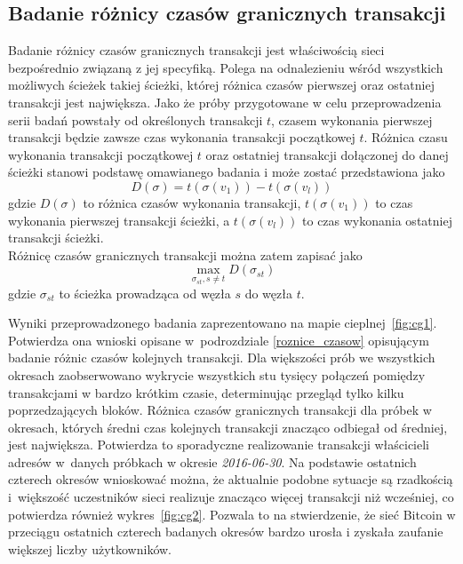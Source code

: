 \documentclass[12pt, twoside, final, openany]{mgr}
\begin{document}
\newpage
\subsection{Badanie różnicy czasów granicznych transakcji}
\label{graniczne_transakcje}
\indent Badanie różnicy czasów granicznych transakcji jest właściwością sieci bezpośrednio związaną z jej specyfiką. Polega na odnalezieniu wśród wszystkich możliwych ścieżek takiej ścieżki, której różnica czasów pierwszej oraz ostatniej transakcji jest największa. Jako że próby przygotowane w celu przeprowadzenia serii badań powstały od określonych transakcji $t$, czasem wykonania pierwszej transakcji będzie zawsze czas wykonania transakcji początkowej $t$. Różnica czasu wykonania transakcji początkowej $t$ oraz ostatniej transakcji dołączonej do danej ścieżki stanowi podstawę omawianego badania i może zostać przedstawiona jako
\begin{equation}
D(\sigma) = t(\sigma(v_1)) - t(\sigma(v_l))
\end{equation}
gdzie $D(\sigma)$ to różnica czasów wykonania transakcji, $t(\sigma(v_1))$ to czas wykonania pierwszej transakcji ścieżki, a $t(\sigma(v_l))$ to czas wykonania ostatniej transakcji ścieżki.
\\ Różnicę czasów granicznych transakcji można zatem zapisać jako
\begin{equation}
 \max_{\sigma_{st},s \ne t} D(\sigma_{st})
\end{equation}
gdzie $\sigma_{st}$ to ścieżka prowadząca od węzła $s$ do węzła $t$.

\indent Wyniki przeprowadzonego badania zaprezentowano na mapie cieplnej~\ref{fig:cg1}. Potwierdza ona wnioski opisane w~podrozdziale \ref{roznice_czasow} opisującym badanie różnic czasów kolejnych transakcji. Dla większości prób we wszystkich okresach zaobserwowano wykrycie wszystkich stu tysięcy połączeń pomiędzy transakcjami w bardzo krótkim czasie, determinując przegląd tylko kilku poprzedzających bloków. Różnica czasów granicznych transakcji dla próbek w okresach, których średni czas kolejnych transakcji znacząco odbiegał od średniej, jest największa. Potwierdza to sporadyczne realizowanie transakcji właścicieli adresów w~danych próbkach w okresie \textit{2016-06-30}. Na podstawie ostatnich czterech okresów wnioskować można, że aktualnie podobne sytuacje są rzadkością i~większość uczestników sieci realizuje znacząco więcej transakcji niż wcześniej, co potwierdza również wykres~\ref{fig:cg2}. Pozwala to na stwierdzenie, że sieć Bitcoin w przeciągu ostatnich czterech badanych okresów bardzo urosła i zyskała zaufanie większej liczby użytkowników.
\end{document}
